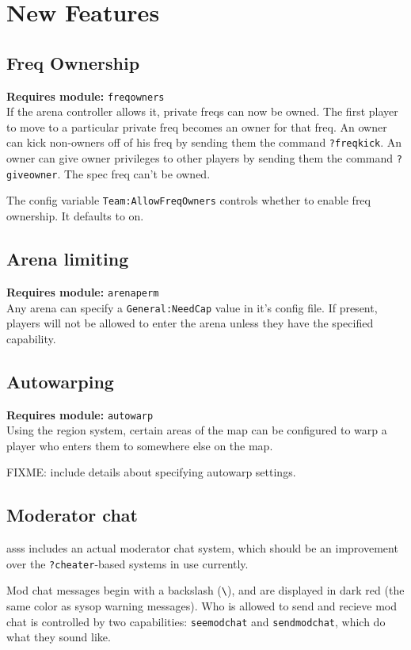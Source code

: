 \documentclass{article}
\newcommand{\asss}{asss}
\newcommand{\requiremod}[1]{\noindent\textbf{Requires module:} \texttt{#1}\\}
\begin{document}
\section{New Features}

\subsection{Freq Ownership}

\requiremod{freqowners}
If the arena controller allows it, private freqs can now be owned. The
first player to move to a particular private freq becomes an owner for
that freq. An owner can kick non-owners off of his freq by sending them
the command \verb/?freqkick/. An owner can give owner privileges to
other players by sending them the command \verb/?giveowner/. The spec
freq can't be owned.

The config variable \texttt{Team:AllowFreqOwners} controls whether to
enable freq ownership. It defaults to on.

\subsection{Arena limiting}

\requiremod{arenaperm}
Any arena can specify a \texttt{General:NeedCap} value in it's config
file. If present, players will not be allowed to enter the arena unless
they have the specified capability.


\subsection{Autowarping}

\requiremod{autowarp}
Using the region system, certain areas of the map can be configured to
warp a player who enters them to somewhere else on the map.

FIXME: include details about specifying autowarp settings.


\subsection{Moderator chat}

\asss{} includes an actual moderator chat system, which should be an
improvement over the \verb/?cheater/-based systems in use currently.

Mod chat messages begin with a backslash (\verb/\/), and are displayed
in dark red (the same color as sysop warning messages). Who is allowed
to send and recieve mod chat is controlled by two capabilities:
\texttt{seemodchat} and \texttt{sendmodchat}, which do what they sound
like.
\end{document}
